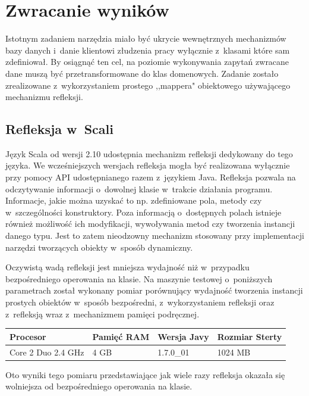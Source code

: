 \documentclass[brudnopis]{xmgr}
\begin{document}
\section{Zwracanie wyników}

Istotnym zadaniem narzędzia miało być ukrycie wewnętrznych mechanizmów bazy danych i~danie klientowi złudzenia pracy wyłącznie z~klasami które sam zdefiniował. By osiągnąć ten cel, na poziomie wykonywania zapytań zwracane dane muszą być przetransformowane do klas domenowych. Zadanie zostało zrealizowane z~wykorzystaniem prostego ,,mappera" obiektowego używającego mechanizmu refleksji.

\subsection{Refleksja w~Scali}

Język Scala od wersji 2.10 udostępnia mechanizm refleksji dedykowany do tego języka. We wcześniejszych wersjach refleksja mogła być realizowana wyłącznie przy pomocy API udostępnianego razem z~językiem Java. Refleksja pozwala na odczytywanie informacji o~dowolnej klasie w~trakcie działania programu. Informacje, jakie można uzyskać to np. zdefiniowane pola, metody czy w~szczególności konstruktory. Poza informacją o~dostępnych polach istnieje również możliwość ich modyfikacji, wywoływania metod czy tworzenia instancji danego typu. Jest to zatem nieodzowny mechanizm stosowany przy implementacji narzędzi tworzących obiekty w~sposób dynamiczny.

Oczywistą wadą refleksji jest mniejsza wydajność niż w~przypadku bezpośredniego operowania na klasie. Na maszynie testowej o~poniższych parametrach został wykonany pomiar porównujący wydajność tworzenia instancji prostych obiektów w~sposób bezpośredni, z~wykorzystaniem refleksji oraz z~refleksją wraz z~mechanizmem pamięci podręcznej.

\begin{tabular}{|l|l|l|l|}
  \hline 
  \textbf{Procesor} & \textbf{Pamięć RAM} & \textbf{Wersja Javy} & \textbf{Rozmiar Sterty} \\
  \hline
  Core 2 Duo 2.4 GHz & 4 GB & 1.7.0\_01 & 1024 MB \\
  \hline
\end{tabular} 

Oto wyniki tego pomiaru przedstawiające jak wiele razy refleksja okazała się wolniejsza od bezpośredniego operowania na klasie.
\end{document}
